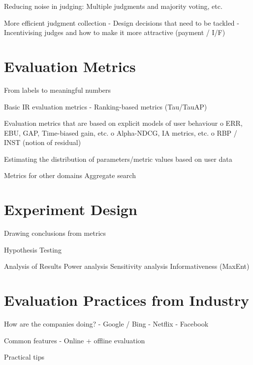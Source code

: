 \documentclass[openany]{now} %
\begin{document}
	Reducing noise in judging: 
	Multiple judgments and majority voting, etc. \cite{Venanzi:2014}
	
	More efficient judgment collection
	-	Design decisions that need to be tackled  \cite{Blanco:2011} \cite{Kazai2012} \cite{Alonso2012} \cite{Alonso:2015}
	-	Incentivising judges and how to make it more attractive (payment / I/F)
	\cite{Megorskaya2015} \cite{Davtyan2015}  \cite{Rokicki:2014}  \cite{Eickhoff:2012}
	
	\chapter{Evaluation Metrics}
	From labels to meaningful numbers
	
	
	Basic IR evaluation metrics 
	-	Ranking-based metrics (Tau/TauAP)
	
	Evaluation metrics that are based on explicit models of user behaviour
	o	ERR, EBU, GAP, Time-biased gain, etc.
	o	Alpha-NDCG, IA metrics, etc.
	o	RBP / INST (notion of residual)
	
	Estimating the distribution of parameters/metric values based on user data
	
	Metrics for other domains
	Aggregate search \cite{Zhou:2013}
	
	\chapter{Experiment Design}
	Drawing conclusions from metrics
	
	Hypothesis Testing
	\cite{Dincer:2014}
	
	Analysis of Results
	Power analysis
	Sensitivity analysis
	Informativeness (MaxEnt)
	\cite{Bron:2013} \cite{Urbano:2013} \cite{Boytsov:2013} \cite{Sakai:2014} \cite{Robertson:2012}
	
	
	
	\chapter{Evaluation Practices from Industry}
	How are the companies doing?
	-	Google / Bing
	-	Netflix \cite{gunawardana2015evaluating} \cite{Gomez-Uribe2015}
	-	Facebook
	
	Common features
	- Online + offline evaluation
	
	Practical tips
	
	
	\backmatter  %
	
	
	
	
\end{document}
